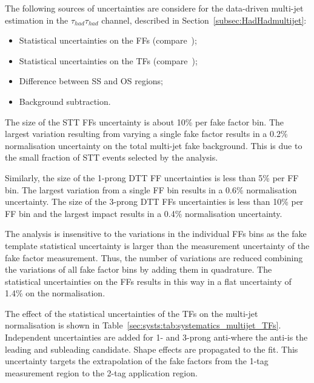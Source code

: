 The following sources of uncertainties are considere for the data-driven multi-jet estimation in the $\tau_{had}\tau_{had}$ channel, described in Section~\ref{subsec:HadHadmultijet}:

\begin{itemize}
\item Statistical uncertainties on the FFs (compare~);
\item Statistical uncertainties on the TFs (compare~);
\item Difference between SS and OS regions;
\item Background subtraction.
\end{itemize}

The size of the STT FFs uncertainty is about 10\% per fake factor bin. The
largest variation resulting from varying a single fake factor results in a
0.2\% normalisation uncertainty on the total multi-jet fake background. This is due to
the small fraction of STT events selected by the analysis.

Similarly, the size of the 1-prong DTT FF uncertainties is less than 5\% per FF
bin. The largest variation from a single FF bin results in a 0.6\% normalisation
uncertainty. The size of the 3-prong DTT FFs uncertainties is less than 10\% per
FF bin and the largest impact results in a 0.4\% normalisation uncertainty.

The analysis is insensitive to the variations in the individual FFs bins as the
fake template statistical uncertainty is larger than the measurement uncertainty
of the fake factor measurement. Thus, the number of variations are reduced
combining the variations of all fake factor bins by adding them in quadrature.
The statistical uncertainties on the FFs results in this way in a flat
uncertainty of 1.4\% on the normalisation.

The effect of the statistical uncertainties of the TFs on the multi-jet
normalisation is shown in Table~\ref{sec:systs:tab:systematics_multijet_TFs}.
Independent uncertainties are added for 1- and 3-prong anti-\tauhad where the
anti-\tauhad is the leading and subleading \tauhad candidate. Shape
effects are propagated to the fit. This uncertainty targets the extrapolation of
the fake factors from the 1-tag measurement region to the 2-tag application
region.

